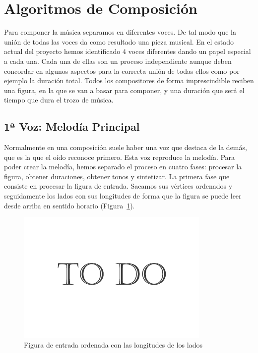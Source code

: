 \section{Algoritmos de Composición}
\label{sec:algComposicion}

Para componer la música separamos en diferentes voces. De tal modo que la unión de todas las voces da como resultado una pieza musical. En el estado actual del proyecto hemos identificado 4 voces diferentes dando un papel especial a cada una. Cada una de ellas son un proceso independiente aunque deben concordar en algunos aspectos para la correcta unión de todas ellos como por ejemplo la duración total. Todos los compositores de forma imprescindible reciben una figura, en la que se van a basar para componer, y una duración que será el tiempo que dura el trozo de música.

\subsection{1ª Voz: Melodía Principal}

Normalmente en una composición suele haber una voz que destaca de la demás, que es la que el oído reconoce primero. Esta voz reproduce la melodía. Para poder crear la melodía, hemos separado el proceso en cuatro fases: procesar la figura, obtener duraciones, obtener tonos y sintetizar. 
La primera fase que consiste en procesar la figura de entrada. Sacamos sus vértices ordenados y seguidamente los lados con sus longitudes de forma que la figura se puede leer desde arriba en sentido horario (Figura~\ref{fig:Figura1Voz1}).

		\begin{figure}[htbp]
		\centering
		\hspace*{0.0in}
		\includegraphics[scale=0.57]{graphics/todo.png}
		\caption{Figura de entrada ordenada con las longitudes de los lados}
		\label{fig:Figura1Voz1}
		\end{figure}

